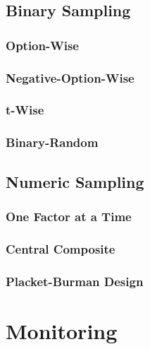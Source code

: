 
\subsection{Binary Sampling}

\subsubsection{Option-Wise}

\subsubsection{Negative-Option-Wise}

\subsubsection{t-Wise}

\subsubsection{Binary-Random}



\subsection{Numeric Sampling}

\subsubsection{One Factor at a Time}

\subsubsection{Central Composite}

\subsubsection{Placket-Burman Design}


\section{Monitoring}

